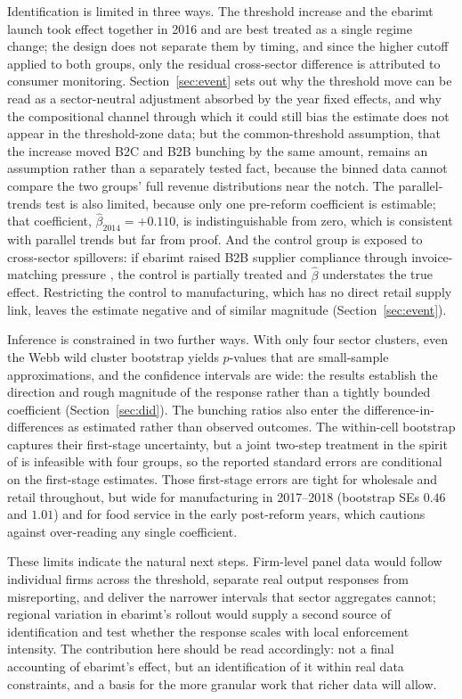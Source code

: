 \documentclass[12pt,oneside,a4paper]{report}
\begin{document}
Identification is limited in three ways. The threshold increase and the ebarimt launch took effect together in 2016 and are best treated as a single regime change; the design does not separate them by timing, and since the higher cutoff applied to both groups, only the residual cross-sector difference is attributed to consumer monitoring. Section~\ref{sec:event} sets out why the threshold move can be read as a sector-neutral adjustment absorbed by the year fixed effects, and why the compositional channel through which it could still bias the estimate does not appear in the threshold-zone data; but the common-threshold assumption, that the increase moved B2C and B2B bunching by the same amount, remains an assumption rather than a separately tested fact, because the binned data cannot compare the two groups' full revenue distributions near the notch. The parallel-trends test is also limited, because only one pre-reform coefficient is estimable; that coefficient, $\hat{\beta}_{2014} = +0.110$, is indistinguishable from zero, which is consistent with parallel trends but far from proof. And the control group is exposed to cross-sector spillovers: if ebarimt raised B2B supplier compliance through invoice-matching pressure \parencite{nyamdavaa2023does}, the control is partially treated and $\hat{\beta}$ understates the true effect. Restricting the control to manufacturing, which has no direct retail supply link, leaves the estimate negative and of similar magnitude (Section~\ref{sec:event}).

Inference is constrained in two further ways. With only four sector clusters, even the Webb wild cluster bootstrap yields $p$-values that are small-sample approximations, and the confidence intervals are wide: the results establish the direction and rough magnitude of the response rather than a tightly bounded coefficient (Section~\ref{sec:did}). The bunching ratios also enter the difference-in-differences as estimated rather than observed outcomes. The within-cell bootstrap captures their first-stage uncertainty, but a joint two-step treatment in the spirit of \textcite{arkhangelsky2024causal} is infeasible with four groups, so the reported standard errors are conditional on the first-stage estimates. Those first-stage errors are tight for wholesale and retail throughout, but wide for manufacturing in 2017--2018 (bootstrap SEs $0.46$ and $1.01$) and for food service in the early post-reform years, which cautions against over-reading any single coefficient.

These limits indicate the natural next steps. Firm-level panel data would follow individual firms across the threshold, separate real output responses from misreporting, and deliver the narrower intervals that sector aggregates cannot; regional variation in ebarimt's rollout would supply a second source of identification and test whether the response scales with local enforcement intensity. The contribution here should be read accordingly: not a final accounting of ebarimt's effect, but an identification of it within real data constraints, and a basis for the more granular work that richer data will allow.
\end{document}
